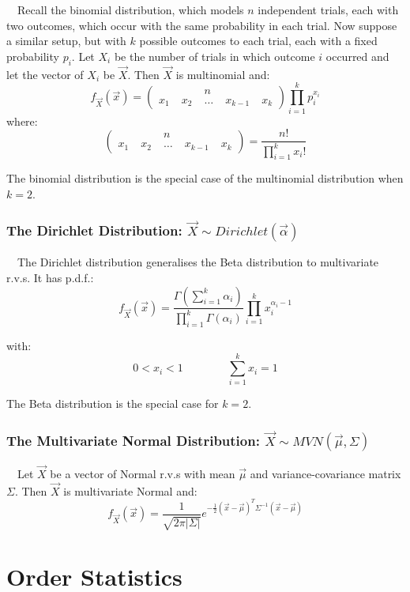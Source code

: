 \documentclass[12pt,a4paper]{article}
\begin{document}
$\quad$Recall the binomial distribution, which models $n$ independent trials, each with two outcomes, which occur with the same probability in each trial. Now suppose a similar setup, but with $k$ possible outcomes to each trial, each with a fixed probability $p_i$. Let $X_i$ be the number of trials in which outcome $i$ occurred and let the vector of $X_i$ be $\vec{X}$. Then $\vec{X}$ is multinomial and:
$$f_{\vec{X}}(\vec{x}) = \left(\begin{array}{ccccc} & & n\;& & \\ x_1\;&x_2\;&\hdots\;&x_{k-1}\;&x_k\end{array}\right)\prod_{i=1}^k p_i^{x_i}$$
where:
$$\left(\begin{array}{ccccc} & & n\;& & \\ x_1\;&x_2\;&\hdots\;&x_{k-1}\;&x_k\end{array}\right) = \frac{n!}{\prod\limits_{i=1}^k x_i!}$$

The binomial distribution is the special case of the multinomial distribution when $k=2$.

\subsubsection{The Dirichlet Distribution: $\vec{X}\sim Dirichlet(\vec{\alpha})$}

$\quad$The Dirichlet distribution generalises the Beta distribution to multivariate r.v.s. It has p.d.f.:
$$f_{\vec{X}}(\vec{x}) = \frac{\Gamma(\sum\limits_{i=1}^k \alpha_i)}{\prod\limits_{i=1}^k \Gamma(\alpha_i)} \prod_{i=1}^k x_i^{\alpha_i -1}$$

with:
$$0 < x_i < 1\qquad\qquad \sum_{i=1}^k x_i = 1$$

The Beta distribution is the special case for $k=2$.

\subsubsection{The Multivariate Normal Distribution: $\vec{X} \sim MVN(\vec{\mu},\Sigma)$}

$\quad$Let $\vec{X}$ be a vector of Normal r.v.s with mean $\vec{\mu}$ and variance-covariance matrix $\Sigma$. Then $\vec{X}$ is multivariate Normal and:
$$f_{\vec{X}}(\vec{x}) = \frac{1}{\sqrt{2 \pi |\Sigma|}}e^{-\frac{1}{2}(\vec{x}-\vec{\mu})^T\Sigma^{-1}(\vec{x}-\vec{\mu})}$$

\clearpage
\section{Order Statistics}\label{order stats}$\;$
\end{document}
